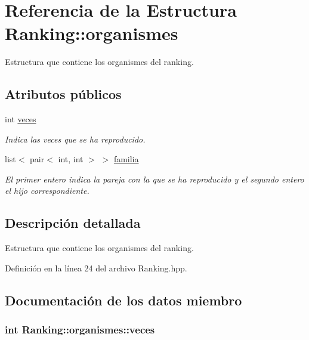 \hypertarget{struct_ranking_1_1organismes}{\section{Referencia de la Estructura Ranking\-:\-:organismes}
\label{struct_ranking_1_1organismes}
}


Estructura que contiene los organismes del ranking.  


\subsection*{Atributos públicos}
\begin{DoxyCompactItemize}
\item 
int \hyperlink{struct_ranking_1_1organismes_a4f45c647417529726e8ce310cffe2fbe}{veces}
\begin{DoxyCompactList}\small\item\em Indica las veces que se ha reproducido. \end{DoxyCompactList}\item 
list$<$ pair$<$ int, int $>$ $>$ \hyperlink{struct_ranking_1_1organismes_ae1bb9f71e85134a2f63f0d4ed50ea6e6}{familia}
\begin{DoxyCompactList}\small\item\em El primer entero indica la pareja con la que se ha reproducido y el segundo entero el hijo correspondiente. \end{DoxyCompactList}\end{DoxyCompactItemize}


\subsection{Descripción detallada}
Estructura que contiene los organismes del ranking. 

Definición en la línea 24 del archivo Ranking.\-hpp.



\subsection{Documentación de los datos miembro}
\hypertarget{struct_ranking_1_1organismes_a4f45c647417529726e8ce310cffe2fbe}{
\subsubsection[{veces}]{\setlength{\rightskip}{0pt plus 5cm}int Ranking\-::organismes\-::veces}}\label{struct_ranking_1_1organismes_a4f45c647417529726e8ce310cffe2fbe}


